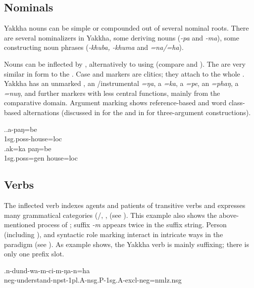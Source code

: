 \subsection{Nominals}

Yakkha nouns can be simple or compounded out of several nominal roots. There are several nominalizers in Yakkha, some deriving nouns (\emph{-pa} and \emph{-ma}), some constructing noun phrases (\emph{-khuba, -khuma} and \emph{=na/=ha}).

 Nouns can be inflected by , alternatively to using  (compare \Next[a] and \Next[b]). The  are very similar in form to the . Case and  markers are clitics; they attach to the whole . Yakkha has an unmarked , an /instrumental \emph{=ŋa}, a  \emph{=ka}, a  \emph{=pe}, an  \emph{=phaŋ}, a  \emph{=nuŋ}, and further markers with less central functions, mainly from the comparative domain. Argument marking shows reference-based and word class-based alternations (discussed in  for the   and in  for three-argument constructions).

\ex.\ag.a-paŋ=be\\
{\sc 1sg.poss-}house{\sc =loc}\\
\bg.ak=ka paŋ=be\\
{\sc 1sg.poss=gen} house{\sc =loc}\\


\subsection{Verbs}

The inflected verb  indexes agents and patients of transitive verbs and expresses many grammatical categories (/, ,  (see \Next). This example also shows the above-mentioned process of ; suffix \emph{-m} appears twice in the suffix string. Person (including ),  and syntactic role marking interact in intricate ways in the  paradigm (see ). As example \Next shows, the Yakkha verb is mainly suffixing; there is only one prefix slot. 

\exg.n-dund-wa-m-ci-m-ŋa-n=ha\\
{\sc neg-}understand{\sc -npst-1pl.A-nsg.P-1sg.A-excl-neg=nmlz.nsg}\\


